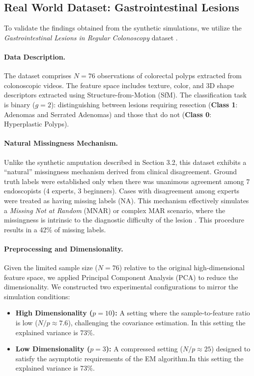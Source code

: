\documentclass[11pt, a4paper]{article}
\begin{document}
\subsection{Real World Dataset: Gastrointestinal Lesions}

To validate the findings obtained from the synthetic simulations, we utilize the \textit{Gastrointestinal Lesions in Regular Colonoscopy} dataset \citep{Mesejo2016}. 

\paragraph{Data Description.}
The dataset comprises $N=76$ observations of colorectal polyps extracted from colonoscopic videos. The feature space includes texture, color, and 3D shape descriptors extracted using Structure-from-Motion (SfM). The classification task is binary ($g=2$): distinguishing between lesions requiring resection (\textbf{Class 1}: Adenomas and Serrated Adenomas) and those that do not (\textbf{Class 0}: Hyperplastic Polyps).

\paragraph{Natural Missingness Mechanism.}
Unlike the synthetic amputation described in Section 3.2, this dataset exhibits a 
``natural'' missingness mechanism derived from clinical disagreement. Ground truth 
labels were established only when there was unanimous agreement among 7 endoscopists 
(4 experts, 3 beginners). Cases with disagreement among experts were treated as having 
missing labels (NA). This mechanism effectively simulates a \textit{Missing Not at Random} 
(MNAR) or complex MAR scenario, where the missingness is intrinsic to the diagnostic 
difficulty of the lesion \citep{Lyu2023}. This procedure results in a 42\% of missing labels.

\paragraph{Preprocessing and Dimensionality.}
Given the limited sample size ($N=76$) relative to the original high-dimensional feature space, we applied Principal Component Analysis (PCA) to reduce the dimensionality. We constructed two experimental configurations to mirror the simulation conditions:
\begin{itemize}
    \item \textbf{High Dimensionality ($p=10$):} A setting where the sample-to-feature ratio is low ($N/p \approx 7.6$), challenging the covariance estimation. In this setting the explained variance is 73\%.
    \item \textbf{Low Dimensionality ($p=3$):} A compressed setting ($N/p \approx 25$) designed to satisfy the asymptotic requirements of the EM algorithm.In this setting the explained variance is 73\%.
\end{itemize}
\end{document}
